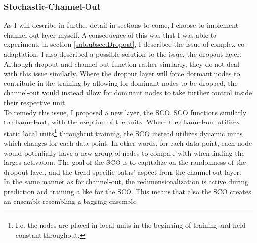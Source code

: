 \subsubsection*{Stochastic-Channel-Out}\label{subsubsec:stochchannelout}
As I will describe in further detail in sections to come, I choose to implement channel-out layer myself. A consequence of this 
was that I was able to experiment. In section \ref{subsubsec:Dropout}, I described the issue of complex co-adaptation. I also described 
a possible solution to the issue, the dropout layer. Although dropout and channel-out function rather similarly, they do not deal 
with this issue similarly. Where the dropout layer will force dormant nodes to contribute in the training by allowing for dominant
nodes to be dropped, the channel-out would instead allow for dominant nodes to take further control inside their respective unit.
\\
To remedy this issue, I proposed a new layer, the \ac{SCO}. \ac{SCO} functions similarly to channel-out, with the exeption of 
the units. Where the channel-out utilizes static local units\footnote{I.e. the nodes are placed in local units in the beginning of training 
and held constant throughout.} throughout training, the \ac{SCO} instead utilizes dynamic units which changes for each data point. In other words, 
for each data point, each node would potentially have a new group of nodes to compare with when finding the larges activation.
The goal of the \ac{SCO} is to capitalize on the randomness of the dropout layer, and the trend specific paths' aspect from the 
channel-out layer.
\\  
In the same manner as for channel-out, the redimensionalization is active during prediction and training a like for the \ac{SCO}. This 
means that also the \ac{SCO} creates an ensemble resembling a bagging ensemble.
